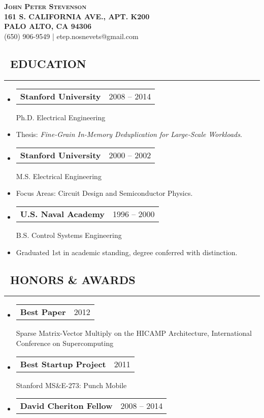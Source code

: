 \documentclass[10pt,letterpaper]{article}
\makeatletter
\newenvironment{resumesection}[1]
{%
    \subsection*{\ #1}
    \vspace{-0.4em}
    \begin{samepage}
    \hrule
    \end{samepage}
    \vspace{+0.4em}
    \begin{itemize}[leftmargin=0.15cm]
        \parskip=0.1em
}%
{%
    \end{itemize}
}%
\newcommand{\headerrowx}[2]
{\item[] \begin{tabular*}{\linewidth}{l@{\extracolsep{\fill}}r}
	#1 &
	#2 \\
\end{tabular*}}
\newcommand{\lminiw}{0.375}
\makeatother
\begin{document}
\begin{center}
{\LARGE{ \textsc{\textbf{John Peter Stevenson}}}} \\
\vspace{0.5em}
\footnotesize{\textbf{161 S. CALIFORNIA AVE., APT. K200}}  \\
\footnotesize{\textbf{PALO ALTO, CA 94306              }}  \\
\footnotesize{{(650) 906-9549} | {etep.nosnevets@gmail.com}}
\end{center}

\begin{minipage}[t]{\lminiw\textwidth}
\begin{resumesection}{EDUCATION}
    \headerrowx{\textbf{Stanford University}}{2008 -- 2014}
    
    Ph.D. Electrical Engineering
    \item[] Thesis: \emph{Fine-Grain In-Memory Deduplication for Large-Scale Workloads}.
    
    \headerrowx{\textbf{Stanford University}}{2000 -- 2002}
    
    M.S. Electrical Engineering
    \item[] Focus Areas: Circuit Design and Semiconductor Physics.
    
    \headerrowx{\textbf{U.S. Naval Academy}}{1996 -- 2000}
    
    B.S. Control Systems Engineering
    \item[] Graduated 1st in academic standing, degree conferred with distinction.
\end{resumesection}

\begin{resumesection}{HONORS \& AWARDS}
    \headerrowx{\textbf{Best Paper}}{2012}
    
    Sparse Matrix-Vector Multiply on the {{HICAMP}} Architecture, International Conference on Supercomputing
    
    \headerrowx{\textbf{Best Startup Project}}{2011}
    
    Stanford MS\&E-273: Punch Mobile
    
    \headerrowx{\textbf{David Cheriton Fellow}}{2008 -- 2014}
    

\end{resumesection}
\end{minipage}
\end{document}
